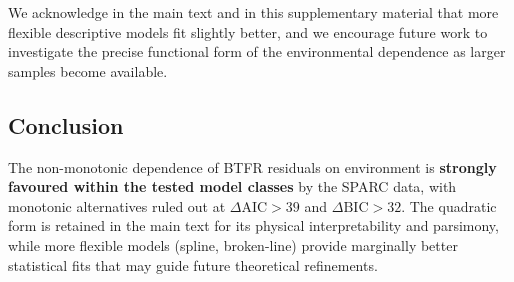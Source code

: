 We acknowledge in the main text and in this supplementary material that
more flexible descriptive models fit slightly better, and we encourage
future work to investigate the precise functional form of the
environmental dependence as larger samples become available.

\subsection*{Conclusion}

The non-monotonic dependence of BTFR residuals on environment is
\textbf{strongly favoured within the tested model classes} by the SPARC data, with monotonic alternatives
ruled out at $\Delta\mathrm{AIC} > 39$ and $\Delta\mathrm{BIC} > 32$.
The quadratic form is retained in the main text for its physical
interpretability and parsimony, while more flexible models (spline,
broken-line) provide marginally better statistical fits that may guide
future theoretical refinements.
